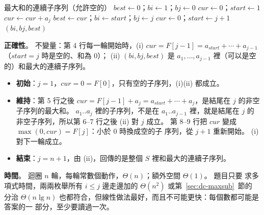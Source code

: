 \begin{pseudo}[label=alg:dc-px-maxsub]{最大和的連續子序列（允許空的）}
    \State $\mathit{best} \gets 0$；$\mathit{bi} \gets 1$；$\mathit{bj} \gets 0$ 
    \State $\mathit{cur} \gets 0$；$\mathit{start} \gets 1$
        \State $\mathit{cur} \gets \mathit{cur} + a_j$
            \State $\mathit{best} \gets \mathit{cur}$；$\mathit{bi} \gets \mathit{start}$；$\mathit{bj} \gets j$
        \EndIf
            \State $\mathit{cur} \gets 0$；$\mathit{start} \gets j + 1$ 
        \EndIf
    \EndFor
    \State \Return $(\mathit{bi}, \mathit{bj}, \mathit{best})$
\EndFunction
\end{pseudo}

\textbf{正確性}。 不變量：第 4 行每一輪開始時，(i) $\mathit{cur} = F[j-1] =
a_{\mathit{start}} + \cdots + a_{j-1}$（$\mathit{start} = j$ 時是空的、和為 $0$）；
(ii) $(\mathit{bi}, \mathit{bj}, \mathit{best})$ 是 $a_1, \ldots, a_{j-1}$ 裡（可以是空
的）和最大的連續子序列。
\begin{itemize}
\item \textbf{初始}：$j = 1$，$\mathit{cur} = 0 = F[0]$，只有空的子序列，(i)(ii) 都成立。
\item \textbf{維持}：第 5 行之後 $\mathit{cur} = F[j-1] + a_j = a_{\mathit{start}} +
\cdots + a_j$，是結尾在 $j$ 的非空子序列的最大和。 $a_1..a_j$ 裡的子序列，不是在
$a_1..a_{j-1}$ 裡，就是結尾在 $j$ 的非空子序列，所以第 6--7 行之後 (ii) 對 $j$ 成立。
第 8--9 行把 $\mathit{cur}$ 變成 $\max(0, \mathit{cur}) = F[j]$：小於 $0$ 時換成空的子
序列，從 $j + 1$ 重新開始。 (i) 對下一輪成立。
\item \textbf{結束}：$j = n + 1$，由 (ii)，回傳的是整個 $S$ 裡和最大的連續子序列。
\end{itemize}

\textbf{時間}。 迴圈 $n$ 輪，每輪常數個動作，$\Theta(n)$；額外空間 $\Theta(1)$。 題目只要
求多項式時間，兩兩枚舉所有 $i \le j$ 邊走邊加的 $\Theta(n^2)$ 或第~\ref{sec:dc-maxsub}~節的
分治 $\Theta(n \lg n)$ 也都符合，但線性做法最好，而且不可能更快：每個數都可能是答案的一
部分，至少要讀過一次。

